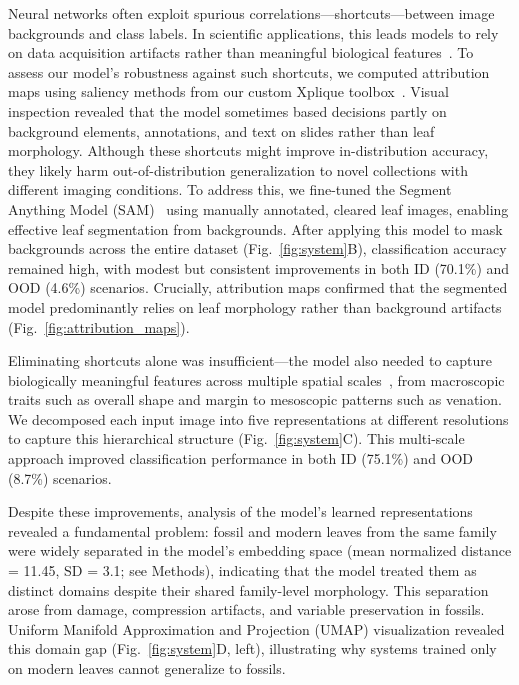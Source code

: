\documentclass[pdflatex,lineno,sn-nature]{sn-jnl}%
\theoremstyle{plain}%
\theoremstyle{definition}%
\theoremstyle{remark}%
\begin{document}
\setlength{\parindent}{15pt}
\indent Neural networks often exploit spurious correlations—shortcuts—between image backgrounds and class labels. In scientific applications, this leads models to rely on data acquisition artifacts rather than meaningful biological features~\citep{Brown2023ShortcutTesting,Hill2024ShortcutRisk,Shahamatdar2024Deceptive}. To assess our model's robustness against such shortcuts, we computed attribution maps using saliency methods from our custom Xplique toolbox~\citep{fel2022xplique}. Visual inspection revealed that the model sometimes based decisions partly on background elements, annotations, and text on slides rather than leaf morphology. Although these shortcuts might improve in-distribution accuracy, they likely harm out-of-distribution generalization to novel collections with different imaging conditions. To address this, we fine-tuned the Segment Anything Model (SAM)~\citep{kirillov2023segment} using manually annotated, cleared leaf images, enabling effective leaf segmentation from backgrounds. After applying this model to mask backgrounds across the entire dataset (Fig.~\ref{fig:system}B), classification accuracy remained high, with modest but consistent improvements in both ID (70.1\%) and OOD (4.6\%) scenarios. Crucially, attribution maps confirmed that the segmented model predominantly relies on leaf morphology rather than background artifacts (Fig.~\ref{fig:attribution_maps}).


Eliminating shortcuts alone was insufficient—the model also needed to capture biologically meaningful features across multiple spatial scales~\citep{Hickey1975}, from macroscopic traits such as overall shape and margin to mesoscopic patterns such as venation. We decomposed each input image into five representations at different resolutions to capture this hierarchical structure (Fig.~\ref{fig:system}C). This multi-scale approach improved classification performance in both ID (75.1\%) and OOD (8.7\%) scenarios.

Despite these improvements, analysis of the model's learned representations revealed a fundamental problem: fossil and modern leaves from the same family were widely separated in the model's embedding space (mean normalized distance = 11.45, SD = 3.1; see Methods), indicating that the model treated them as distinct domains despite their shared family-level morphology. This separation arose from damage, compression artifacts, and variable preservation in fossils. Uniform Manifold Approximation and Projection (UMAP) visualization revealed this domain gap (Fig.~\ref{fig:system}D, left), illustrating why systems trained only on modern leaves cannot generalize to fossils.
\end{document}
